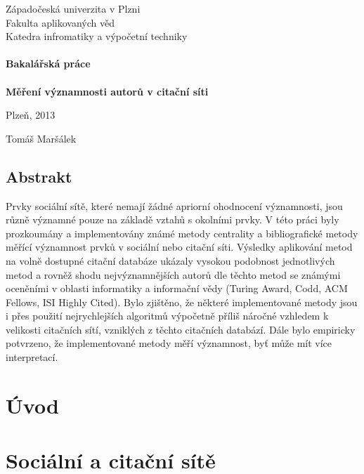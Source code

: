 \documentclass[12pt,titlepage]{report}
\begin{document}
\shorthandoff{-}

\begin{titlepage}
\begin{center}
	\Large{Západočeská univerzita v Plzni} \\
	\Large{Fakulta aplikovaných věd} \\
	\Large{Katedra infromatiky a výpočetní techniky} \\
\mbox{} \\[1.6cm]
	\LARGE{{\bf Bakalářská práce}} \\
\mbox{} \\
	\Huge{{\bf Měření významnosti autorů v citační síti}} \\
\end{center}
\vfill
\begin{minipage}{.5\textwidth}
Plzeň, 2013
\end{minipage}
\begin{minipage}{.5\textwidth}
\hfill Tomáš Maršálek
\end{minipage}
\thispagestyle{empty}
\end{titlepage}

\section*{Abstrakt}
Prvky sociální sítě, které nemají žádné apriorní ohodnocení významnosti, jsou
různě významné pouze na základě vztahů s okolními prvky. V této práci byly
prozkoumány a implementovány známé metody centrality a bibliografické metody
měřící významnost prvků v sociální nebo citační síti. Výsledky aplikování metod
na volně dostupné citační databáze ukázaly vysokou podobnost jednotlivých metod
a rovněž shodu nejvýznamnějších autorů dle těchto metod se známými oceněními v
oblasti informatiky a informační vědy (Turing Award, Codd, ACM Fellows, ISI
Highly Cited). Bylo zjištěno, že některé implementované metody jsou i přes
použití nejrychlejších algoritmů výpočetně příliš náročné vzhledem k velikosti
citačních sítí, vzniklých z těchto citačních databází. Dále bylo empiricky
potvrzeno, že implementované metody měří významnost, byť může mít více
interpretací.

\tableofcontents

\chapter{Úvod}

\chapter{Sociální a citační sítě}
\end{document}
